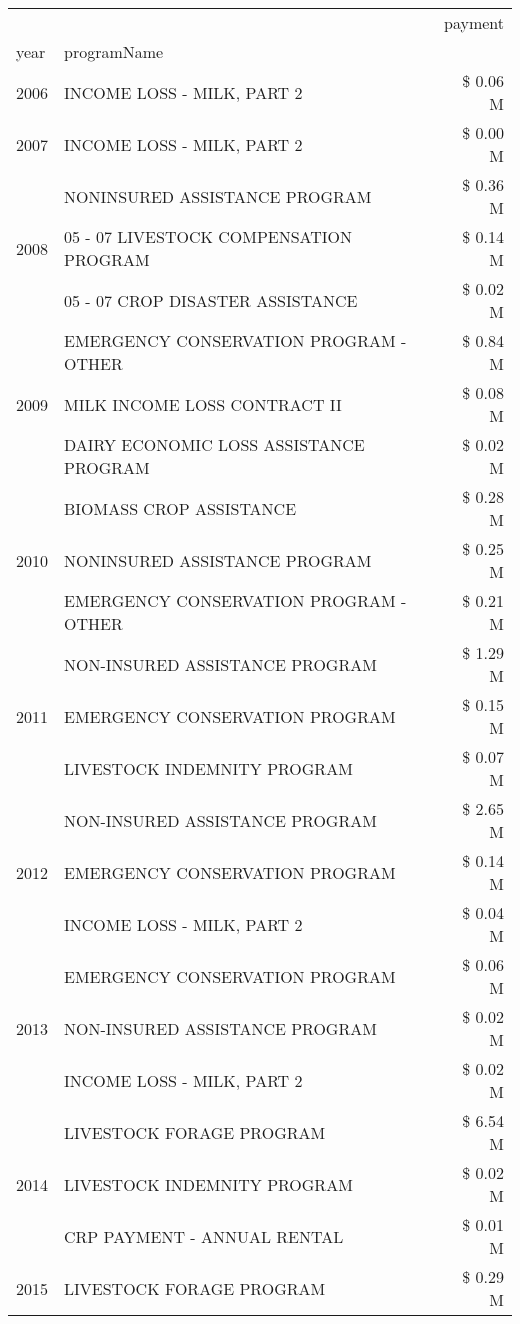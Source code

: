 \begin{tabular}{llr}
\toprule
 &  & payment \\
year & programName &  \\
\midrule
2006 & INCOME LOSS - MILK, PART 2 & \$ 0.06 M \\
\cline{1-3}
2007 & INCOME LOSS - MILK, PART 2 & \$ 0.00 M \\
\cline{1-3}
\multirow[t]{3}{*}{2008} & NONINSURED ASSISTANCE PROGRAM & \$ 0.36 M \\
 & 05 - 07 LIVESTOCK COMPENSATION PROGRAM & \$ 0.14 M \\
 & 05 - 07 CROP DISASTER ASSISTANCE & \$ 0.02 M \\
\cline{1-3}
\multirow[t]{3}{*}{2009} & EMERGENCY CONSERVATION PROGRAM - OTHER & \$ 0.84 M \\
 & MILK INCOME LOSS CONTRACT II & \$ 0.08 M \\
 & DAIRY ECONOMIC LOSS ASSISTANCE PROGRAM & \$ 0.02 M \\
\cline{1-3}
\multirow[t]{3}{*}{2010} & BIOMASS CROP ASSISTANCE & \$ 0.28 M \\
 & NONINSURED ASSISTANCE PROGRAM & \$ 0.25 M \\
 & EMERGENCY CONSERVATION PROGRAM - OTHER & \$ 0.21 M \\
\cline{1-3}
\multirow[t]{3}{*}{2011} & NON-INSURED ASSISTANCE PROGRAM & \$ 1.29 M \\
 & EMERGENCY CONSERVATION PROGRAM & \$ 0.15 M \\
 & LIVESTOCK INDEMNITY PROGRAM & \$ 0.07 M \\
\cline{1-3}
\multirow[t]{3}{*}{2012} & NON-INSURED ASSISTANCE PROGRAM & \$ 2.65 M \\
 & EMERGENCY CONSERVATION PROGRAM & \$ 0.14 M \\
 & INCOME LOSS - MILK, PART 2 & \$ 0.04 M \\
\cline{1-3}
\multirow[t]{3}{*}{2013} & EMERGENCY CONSERVATION PROGRAM & \$ 0.06 M \\
 & NON-INSURED ASSISTANCE PROGRAM & \$ 0.02 M \\
 & INCOME LOSS - MILK, PART 2 & \$ 0.02 M \\
\cline{1-3}
\multirow[t]{3}{*}{2014} & LIVESTOCK FORAGE PROGRAM & \$ 6.54 M \\
 & LIVESTOCK INDEMNITY PROGRAM & \$ 0.02 M \\
 & CRP PAYMENT - ANNUAL RENTAL & \$ 0.01 M \\
\cline{1-3}
\multirow[t]{3}{*}{2015} & LIVESTOCK FORAGE PROGRAM & \$ 0.29 M \\

\end{tabular}
